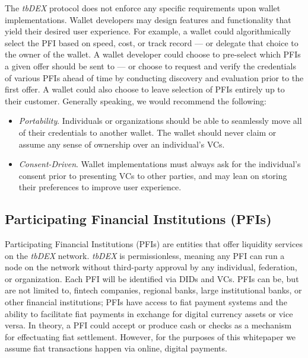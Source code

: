 \documentclass[11pt]{article}
\begin{document}
\vspace{1\baselineskip}
The \textit{tbDEX }protocol does not enforce any specific requirements upon wallet implementations. Wallet developers may design features and functionality that yield their desired user experience. For example, a wallet could algorithmically select the PFI based on speed, cost, or track record — or delegate that choice to the owner of the wallet. A wallet developer could choose to pre-select which PFIs a given offer should be sent to — or choose to request and verify the credentials of various PFIs ahead of time by conducting discovery and evaluation prior to the first offer. A wallet could also choose to leave selection of PFIs entirely up to their customer. Generally speaking, we would recommend the following:

\begin{itemize}
	\item \textit{Portability}. Individuals or organizations should be able to seamlessly move all of their credentials to another wallet. The wallet should never claim or assume any sense of ownership over an individual’s VCs.

	\item \textit{Consent-Driven}. Wallet implementations must always ask for the individual’s consent prior to presenting VCs to other parties, and may lean on storing their preferences to improve user experience.

\end{itemize}
\subsection{Participating Financial Institutions (PFIs)}

\vspace{1\baselineskip}
Participating Financial Institutions (PFIs) are entities that offer liquidity services on the \textit{tbDEX }network. \textit{tbDEX }is permissionless, meaning any PFI can run a node on the network without third-party approval by any individual, federation, or organization.  Each PFI will be identified via DIDs and VCs. PFIs can be, but are not limited to, fintech companies, regional banks, large institutional banks, or other financial institutions; PFIs have access to fiat payment systems and the ability to facilitate fiat payments in exchange for digital currency assets or vice versa. In theory, a PFI could accept or produce cash or checks as a mechanism for effectuating fiat settlement. However, for the purposes of this whitepaper we assume fiat transactions happen via online, digital payments.
\end{document}
